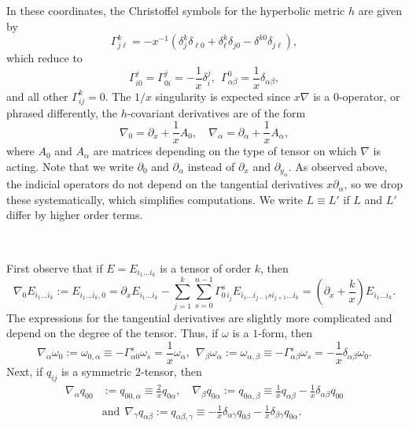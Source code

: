 \documentclass[10pt,reqno]{amsart}
\newcommand{\del}{\partial}
\begin{document}
In these coordinates, the Christoffel symbols for the hyperbolic metric $h$ are given by 
\[
\Gamma^k_{j\ell} = -x^{-1} ( \delta_j^k \delta_{\ell 0} + \delta_\ell^k \delta_{j0} - \delta^{k0}\delta_{j\ell}),
\]
which reduce to
\[
\Gamma^j_{i 0} = \Gamma^j_{0i} = -\frac{1}{x} \delta^j_i,\ \ \Gamma^0_{\alpha \beta} = \frac{1}{x} \delta_{\alpha \beta},
\]
and all other $\Gamma^k_{ij} = 0$. The $1/x$ singularity is expected since $x\nabla$ is a $0$-operator, or phrased differently, the $h$-covariant 
derivatives are of the form
\[
\nabla_0 = \del_x + \frac{1}{x} A_0, \quad \nabla_\alpha = \del_\alpha + \frac{1}{x} A_\alpha,
\]
where $A_0$ and $A_\alpha$ are matrices depending on the type of tensor on which $\nabla$ is acting.  Note that we write
$\del_0$ and $\del_\alpha$ instead of $\del_x$ and $\del_{y_\alpha}$. 
As observed above, the indicial operators do not depend on the tangential derivatives $x\del_\alpha$, so we drop these systematically,
which simplifies computations. We write $L \equiv L'$ if $L$ and $L'$ differ by higher order terms.

\

First observe that if $E = E_{i_1 \ldots i_k}$ is a tensor of order $k$, then 
\[
\nabla_0 E_{i_1 \ldots i_k}  := E_{i_1 \ldots i_k, 0} = \del_x E_{i_1 \ldots i_k} - \sum_{j=1}^k \sum_{s=0}^{n-1}  \Gamma^s_{0 \, i_j} E_{i_1 \ldots i_{j-1} s i_{j+1} \ldots i_k} 
= (\del_x + \frac{k}{x}) E_{i_1 \ldots i_k}. 
\]
The expressions for the tangential derivatives are slightly more complicated and depend on the degree of the tensor.  Thus, if $\omega$ is a $1$-form, then
\[
\nabla_\alpha \omega_0 := \omega_{0,\alpha} \equiv -\Gamma^s_{\alpha 0} \omega_s = \frac{1}{x}\omega_\alpha,\ \ \nabla_\beta \omega_\alpha := \omega_{\alpha, \beta} 
\equiv -\Gamma^s_{\alpha \beta}\omega_s = -\frac{1}{x} \delta_{\alpha \beta} \omega_0.
\]
Next, if $q_{ij}$ is a symmetric $2$-tensor, then 
\begin{align*}
\nabla_\alpha q_{00} & := q_{00,\alpha} \equiv \frac{2}{x} q_{0\alpha},\quad \nabla_\beta q_{0 \alpha} := q_{0 \alpha, \beta} \equiv \frac{1}{x} q_{\alpha \beta} - 
\frac{1}{x} \delta_{\alpha \beta}  q_{0 0}\\
& \mbox{and}\ \ \nabla_\gamma q_{\alpha \beta} := q_{\alpha \beta, \gamma} \equiv -\frac{1}{x} \delta_{\alpha \gamma} q_{0 \beta} - \frac{1}{x} \delta_{\beta \gamma} q_{0 \alpha}.
\end{align*}
\end{document}
